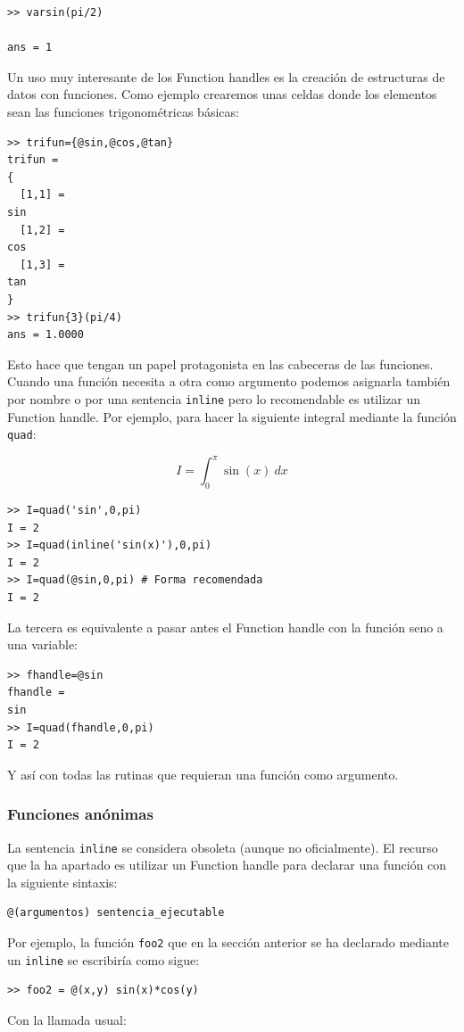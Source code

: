 \begin{verbatim}
>> varsin(pi/2)

ans = 1
\end{verbatim}
Un uso muy interesante de los Function handles es la creación de
estructuras de datos con funciones. Como ejemplo crearemos unas celdas
donde los elementos sean las funciones trigonométricas básicas:

\begin{verbatim}
>> trifun={@sin,@cos,@tan}
trifun =
{
  [1,1] =
sin
  [1,2] =
cos
  [1,3] =
tan
}
>> trifun{3}(pi/4)
ans = 1.0000
\end{verbatim}
Esto hace que tengan un papel protagonista en las cabeceras de las
funciones. Cuando una función necesita a otra como argumento podemos
asignarla también por nombre o por una sentencia \texttt{inline} pero
lo recomendable es utilizar un Function handle. Por ejemplo, para
hacer la siguiente integral mediante la función \texttt{quad}:

$$I=\int_{0}^{\pi}\sin(x)\ dx$$


\begin{verbatim}
>> I=quad('sin',0,pi)
I = 2
>> I=quad(inline('sin(x)'),0,pi)
I = 2
>> I=quad(@sin,0,pi) # Forma recomendada
I = 2
\end{verbatim}
La tercera es equivalente a pasar antes el Function handle con la
función seno a una variable:

  \begin{verbatim}
>> fhandle=@sin
fhandle =
sin
>> I=quad(fhandle,0,pi)
I = 2
\end{verbatim}
Y así con todas las rutinas que requieran una función como argumento.


\subsubsection{Funciones anónimas}

La sentencia \texttt{inline} se considera obsoleta (aunque no
oficialmente).  El recurso que la ha apartado es utilizar un Function
handle para declarar una función con la siguiente sintaxis:

\begin{verbatim}
@(argumentos) sentencia_ejecutable
\end{verbatim}
Por ejemplo, la función \texttt{foo2} que en la sección anterior se ha
declarado mediante un \texttt{inline} se escribiría como sigue:

\begin{verbatim}
>> foo2 = @(x,y) sin(x)*cos(y)
\end{verbatim}
Con la llamada usual:

